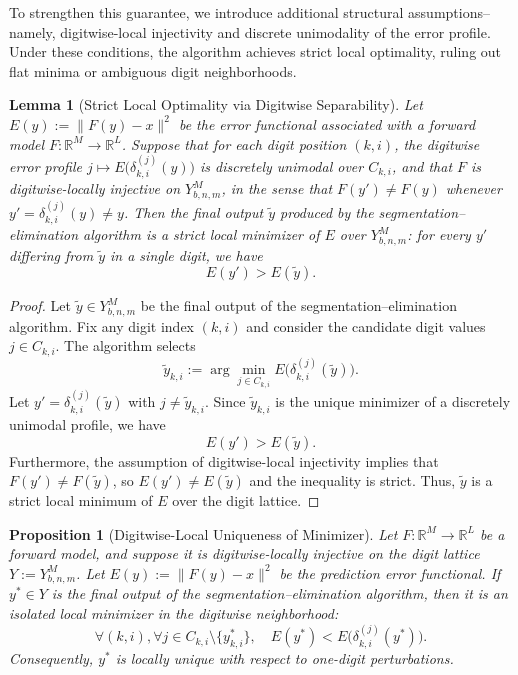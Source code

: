 \documentclass[aps,twocolumn,superscriptaddress,nofootinbib]{revtex4}
\newtheorem{lemma}{Lemma}
\newtheorem{proposition}{Proposition}
\begin{document}
To strengthen this guarantee, we introduce additional structural assumptions--namely, digitwise-local injectivity and discrete unimodality of the error profile. Under these conditions, the algorithm achieves strict local optimality, ruling out flat minima or ambiguous digit neighborhoods.

\begin{lemma}[Strict Local Optimality via Digitwise Separability]
Let $E(y) := \|F(y) - x\|^2$ be the error functional associated with a forward model $F : \mathbb{R}^M \to \mathbb{R}^L$. Suppose that for each digit position $(k, i)$, the digitwise error profile $j \mapsto E\big(\delta^{(j)}_{k,i}(y)\big)$ is discretely unimodal over $C_{k,i}$, and that $F$ is digitwise-locally injective on $Y^M_{b,n,m}$, in the sense that $F(y') \neq F(y)$ whenever $y' = \delta^{(j)}_{k,i}(y) \neq y$. Then the final output $\tilde{y}$ produced by the segmentation--elimination algorithm is a strict local minimizer of $E$ over $Y^M_{b,n,m}$: for every $y'$ differing from $\tilde{y}$ in a single digit, we have
\begin{equation}
    E(y') > E(\tilde{y}). \label{eq:strict-local-opt}
\end{equation}
\end{lemma}

\begin{proof}
Let $\tilde{y} \in Y^M_{b,n,m}$ be the final output of the segmentation--elimination algorithm. Fix any digit index $(k,i)$ and consider the candidate digit values $j \in C_{k,i}$. The algorithm selects
\begin{equation}
    \tilde{y}_{k,i} := \arg\min_{j \in C_{k,i}} E\big(\delta^{(j)}_{k,i}(\tilde{y})\big). \label{eq:digitwise-optimality}
\end{equation}
Let $y' = \delta^{(j)}_{k,i}(\tilde{y})$ with $j \neq \tilde{y}_{k,i}$. Since $\tilde{y}_{k,i}$ is the unique minimizer of a discretely unimodal profile, we have
\begin{equation}
    E(y') > E(\tilde{y}). \label{eq:strict-improvement}
\end{equation}
Furthermore, the assumption of digitwise-local injectivity implies that $F(y') \neq F(\tilde{y})$, so $E(y') \neq E(\tilde{y})$ and the inequality is strict. Thus, $\tilde{y}$ is a strict local minimum of $E$ over the digit lattice.
\end{proof}

\begin{proposition}[Digitwise-Local Uniqueness of Minimizer]
\label{prop:digitwise_uniqueness}
Let \( F: \mathbb{R}^M \to \mathbb{R}^L \) be a forward model, and suppose it is digitwise-locally injective on the digit lattice \( Y := Y_{b,n,m}^M \). Let \( E(y) := \|F(y) - x\|^2 \) be the prediction error functional. If \( y^* \in Y \) is the final output of the segmentation--elimination algorithm, then it is an isolated local minimizer in the digitwise neighborhood:
\[
\forall (k,i), \forall j \in C_{k,i} \setminus \{y^*_{k,i}\}, \quad E(y^*) < E\big(\delta^{(j)}_{k,i}(y^*)\big).
\]
Consequently, \( y^* \) is locally unique with respect to one-digit perturbations.
\end{proposition}
\end{document}
